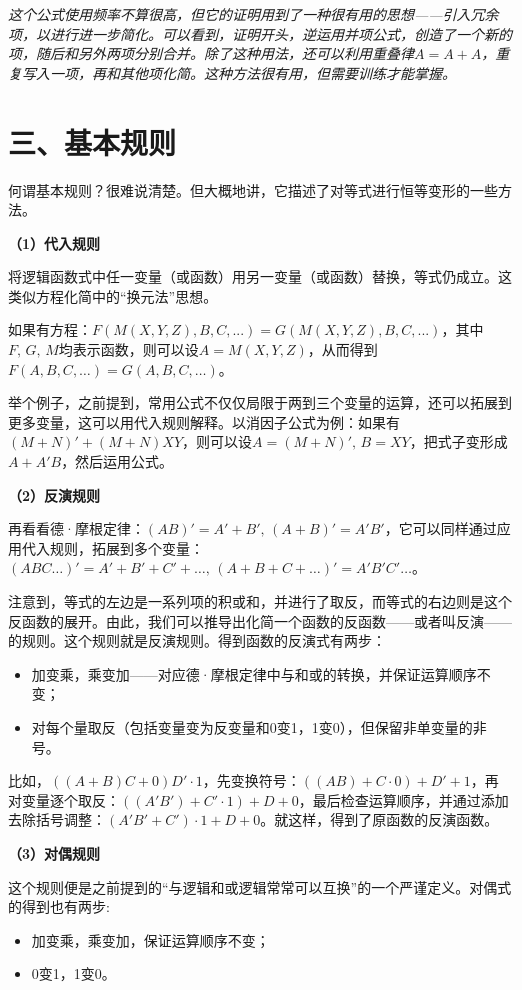 \documentclass[UTF8]{ctexart}
\begin{document}
\textit{这个公式使用频率不算很高，但它的证明用到了一种很有用的思想——引入冗余项，以进行进一步简化。可以看到，证明开头，逆运用并项公式，创造了一个新的项，随后和另外两项分别合并。除了这种用法，还可以利用重叠律$A=A+A$，重复写入一项，再和其他项化简。这种方法很有用，但需要训练才能掌握。}

\section*{三、基本规则}

何谓基本规则？很难说清楚。但大概地讲，它描述了对等式进行恒等变形的一些方法。

\textbf{（1）代入规则}

将逻辑函数式中任一变量（或函数）用另一变量（或函数）替换，等式仍成立。这类似方程化简中的“换元法”思想。

如果有方程：$F(M(X,Y,Z),B,C,...)=G(M(X,Y,Z),B,C,...)$，其中$F,\,G,\,M$均表示函数，则可以设$A=M(X,Y,Z)$，从而得到$F(A,B,C,\dots)=G(A,B,C,\dots)$。

举个例子，之前提到，常用公式不仅仅局限于两到三个变量的运算，还可以拓展到更多变量，这可以用代入规则解释。以消因子公式为例：如果有$(M+N)'+(M+N)XY$，则可以设$A=(M+N)',\,B=XY$，把式子变形成$A+A'B$，然后运用公式。

\textbf{（2）反演规则}

再看看德·摩根定律：$(AB)'=A'+B',\,(A+B)'=A'B'$，它可以同样通过应用代入规则，拓展到多个变量：$(ABC\dots)'=A'+B'+C'+\dots,\,(A+B+C+\dots)'=A'B'C'\dots$。

注意到，等式的左边是一系列项的积或和，并进行了取反，而等式的右边则是这个反函数的展开。由此，我们可以推导出化简一个函数的反函数——或者叫反演——的规则。这个规则就是反演规则。得到函数的反演式有两步：

\begin{itemize}
\item 加变乘，乘变加——对应德·摩根定律中与和或的转换，并保证运算顺序不变；
\item 对每个量取反（包括变量变为反变量和0变1，1变0），但保留非单变量的非号。
\end{itemize}
比如，$((A+B)C+0)D'\cdot 1$，先变换符号：$((AB)+C\cdot0)+D'+1$，再对变量逐个取反：$((A'B')+C'\cdot1)+D+0$，最后检查运算顺序，并通过添加去除括号调整：$(A'B'+C')\cdot1+D+0$。就这样，得到了原函数的反演函数。

\textbf{（3）对偶规则}

这个规则便是之前提到的“与逻辑和或逻辑常常可以互换”的一个严谨定义。对偶式的得到也有两步:

\begin{itemize}
\item 加变乘，乘变加，保证运算顺序不变；
\item 0变1，1变0。
\end{itemize}
\end{document}
